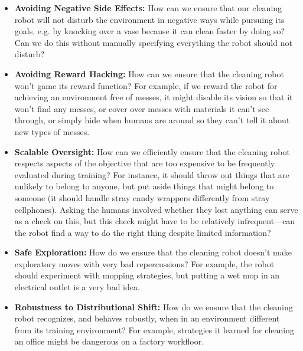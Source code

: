 \documentclass[a4paper,10pt]{article}
\begin{document}
\begin{itemize}
\item {\bf Avoiding Negative Side Effects:} How can we ensure that our cleaning robot will not disturb the environment in negative ways while pursuing its goals, e.g. by knocking over a vase because it can clean faster by doing so?  Can we do this without manually specifying everything the robot should not disturb?
\item {\bf Avoiding Reward Hacking:} How can we ensure that the cleaning robot won’t game its reward function? For example, if we reward the robot for achieving an environment free of messes, it might disable its vision so that it won’t find any messes, or cover over messes with materials it can’t see through, or simply hide when humans are around so they can’t tell it about new types of messes.
\item {\bf Scalable Oversight:} How can we efficiently ensure that the cleaning robot respects aspects of the objective that are too expensive to be frequently evaluated during training?  For instance, it should throw out things that are unlikely to belong to anyone, but put aside things that might belong to someone (it should handle stray candy wrappers differently from stray cellphones). Asking the humans involved whether they lost anything can serve as a check on this, but this check might have to be relatively infrequent---can the robot find a way to do the right thing despite limited information?
\item {\bf Safe Exploration:} How do we ensure that the cleaning robot doesn’t make exploratory moves with very bad repercussions? For example, the robot should experiment with mopping strategies, but putting a wet mop in an electrical outlet is a very bad idea. 
\item {\bf Robustness to Distributional Shift:} How do we ensure that the cleaning robot recognizes, and behaves robustly, when in an environment different from its training environment? For example, strategies it learned for cleaning an office might be dangerous on a factory workfloor.
\end{itemize}
\end{document}
